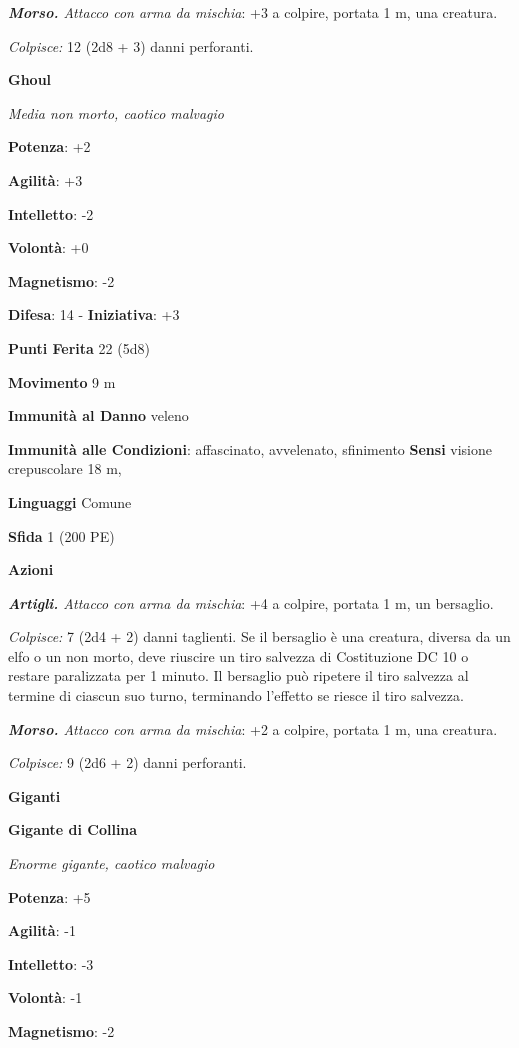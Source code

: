 \begin{multicols}{2}
\emph{\textbf{Morso.} Attacco con arma da mischia}: +3 a colpire,
portata 1 m, una creatura.

\emph{Colpisce:} 12 (2d8 + 3) danni perforanti.

\textbf{Ghoul}

\emph{Media non morto, caotico malvagio}

\textbf{Potenza}: +2

\textbf{Agilità}: +3

\textbf{Intelletto}: -2

\textbf{Volontà}: +0

\textbf{Magnetismo}: -2

\textbf{Difesa}: 14 - \textbf{Iniziativa}: +3

\textbf{Punti Ferita} 22 (5d8)

\textbf{Movimento} 9 m

\textbf{Immunità al Danno} veleno

\textbf{Immunità alle Condizioni}: affascinato, avvelenato, sfinimento
\textbf{Sensi} visione crepuscolare 18 m, 

\textbf{Linguaggi} Comune

\textbf{Sfida} 1 (200 PE)\smallskip

\smallskip\textbf{Azioni}

\emph{\textbf{Artigli.} Attacco con arma da mischia}: +4 a colpire,
portata 1 m, un bersaglio.

\emph{Colpisce:} 7 (2d4 + 2) danni taglienti. Se il bersaglio è una
creatura, diversa da un elfo o un non morto, deve riuscire un tiro
salvezza di Costituzione DC 10 o restare paralizzata per 1 minuto. Il
bersaglio può ripetere il tiro salvezza al termine di ciascun suo turno,
terminando l'effetto se riesce il tiro salvezza.

\emph{\textbf{Morso.} Attacco con arma da mischia}: +2 a colpire,
portata 1 m, una creatura.

\emph{Colpisce:} 9 (2d6 + 2) danni perforanti.



\textbf{Giganti}

\textbf{Gigante di Collina}

\emph{Enorme gigante, caotico malvagio}

\textbf{Potenza}: +5

\textbf{Agilità}: -1

\textbf{Intelletto}: -3

\textbf{Volontà}: -1

\textbf{Magnetismo}: -2


\end{multicols}
